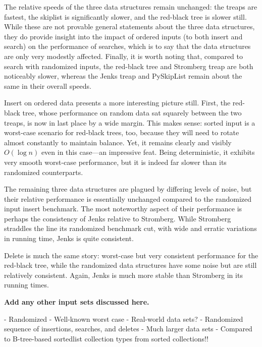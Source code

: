 \documentclass{article}
\newcommand {\todo}[1] {{\textbf{\color{red}#1}}}
\begin{document}
The relative speeds of the three data structures remain unchanged: the treaps are fastest, the skiplist is significantly slower, and the red-black tree is slower still. While these are not provable general statements about the three data structures, they do provide insight into the impact of ordered inputs (to both insert and search) on the performance of searches, which is to say that the data structures are only very modestly affected. Finally, it is worth noting that, compared to search with randomized inputs, the red-black tree and Stromberg treap are both noticeably slower, whereas the Jenks treap and PySkipList remain about the same in their overall speeds.



Insert on ordered data presents a more interesting picture still. First, the red-black tree, whose performance on random data sat squarely between the two treaps, is now in last place by a wide margin. This makes sense: sorted input is a worst-case scenario for red-black trees, too, because they will need to rotate almost constantly to maintain balance. Yet, it remains clearly and visibly $O(\log n)$ even in this case---an impressive feat. Being deterministic, it exhibits very smooth worst-case performance, but it is indeed far slower than its randomized counterparts.

The remaining three data structures are plagued by differing levels of noise, but their relative performance is essentially unchanged compared to the randomized input insert benchmark. The most noteworthy aspect of their performance is perhaps the consistency of Jenks relative to Stromberg. While Stromberg straddles the line its randomized benchmark cut, with wide and erratic variations in running time, Jenks is quite consistent.



Delete is much the same story: worst-case but very consistent performance for the red-black tree, while the randomized data structures have some noise but are still relatively consistent. Again, Jenks is much more stable than Stromberg in its running times.

\todo{Add any other input sets discussed here.}

- Randomized
- Well-known worst case
- Real-world data sets?
- Randomized sequence of insertions, searches, and deletes
- Much larger data sets
- Compared to B-tree-based sortedlist collection types from sorted collections!!
\end{document}

